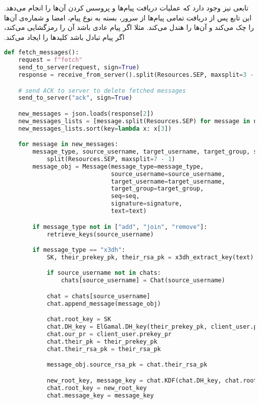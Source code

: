 ‫تابعی نیز وجود دارد که عملیات دریافت پیام‌ها و پروسس کردن آن‌ها را انجام می‌دهد. این تابع پس از دریافت تمامی پیام‌ها از سرور، بسته به نوع پیام، امضا و شماره‌ی آن‌ها را چک می‌کند و آن‌ها را هندل می‌کند. مثلا اگر پیام عادی باشد آن را رمزگشایی می‌کند، اگر پیام تبادل  باشد کلیدها را ایجاد می‌کند.
‫
\begin{latin}
\begin{lstlisting}[firstnumber=441, language=Python]
def fetch_messages():
    request = f"fetch"
    send_to_server(request, sign=True)
    response = receive_from_server().split(Resources.SEP, maxsplit=3 - 1)

    # send ACK to server to delete fetched messages
    send_to_server("ack", sign=True)

    new_messages = json.loads(response[2])
    new_messages_lists = [message.split(Resources.SEP) for message in new_messages]
    new_messages_lists.sort(key=lambda x: x[3])

    for message in new_messages:
        message_type, source_username, target_username, target_group, seq, signature, text = message. \
            split(Resources.SEP, maxsplit=7 - 1)
        message_obj = Message(message_type=message_type,
                              source_username=source_username,
                              target_username=target_username,
                              target_group=target_group,
                              seq=seq,
                              signature=signature,
                              text=text)

        if message_type not in ["add", "join", "remove"]:
            retrieve_keys(source_username)

        if message_type == "x3dh":
            SK, their_prekey_pk, their_rsa_pk = x3dh_extract_key(text)

            if source_username not in chats:
                chats[source_username] = Chat(source_username)

            chat = chats[source_username]
            chat.append_message(message_obj)

            chat.root_key = SK
            chat.DH_key = ElGamal.DH_key(their_prekey_pk, client_user.prekey_pr)
            chat.our_pr = client_user.prekey_pr
            chat.their_pk = their_prekey_pk
            chat.their_rsa_pk = their_rsa_pk

            message_obj.source_rsa_pk = chat.their_rsa_pk

            new_root_key, message_key = chat.KDF(chat.DH_key, chat.root_key)
            chat.root_key = new_root_key
            chat.message_key = message_key


\end{lstlisting}
\end{latin}
